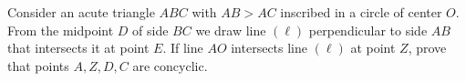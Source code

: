Consider an acute triangle $ABC$ with $AB>AC$ inscribed in a circle  of center $O$. From the midpoint $D$ of side $BC$ we draw line $(\ell)$ perpendicular to side $AB$ that intersects it at point $E$. If line $AO$ intersects line $(\ell)$ at point $Z$, prove that points $A,Z,D,C$ are concyclic.